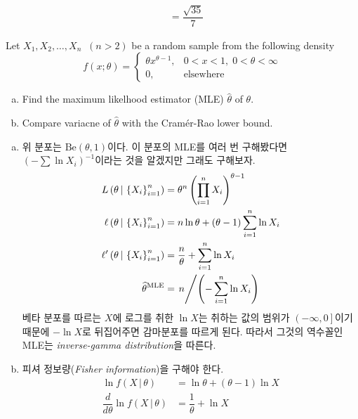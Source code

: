 \documentclass[answers]{exam}
\begin{document}
\begin{questions}
\begin{solution}
\begin{enumerate}[(a)]
\begin{align}
    			&= \dfrac{\sqrt{35}}{7}
    		\end{align}
    	\end{enumerate}
    \end{solution}
    \question
    Let $X_{1},X_{2},\ldots,X_{n}\;\;\left(n>2\right)$ be a random sample from the following density
    $$
      f\left(x;\theta\right)=\begin{cases}\theta x^{\theta-1}, & 0<x<1,\;0<\theta<\infty \\ 0, & \text{elsewhere}\end{cases}
    $$
    \begin{enumerate}[(a)]
      \item Find the maximum likelhood estimator (MLE) $\widehat{\theta}$ of $\theta$.
      \item Compare variacne of $\widehat{\theta}$ with the Cramér-Rao lower bound.
    \end{enumerate}
    \begin{solution}
    	\begin{enumerate}[(a)]
    		\item 위 분포는 $\mathrm{Be}\left(\theta,1\right)$이다. 이 분포의 MLE를 여러 번 구해봤다면 $\left(-\sum \ln X_{i}\right)^{-1}$이라는 것을 알겠지만 그래도 구해보자.
    		\begin{align}
    			L\left(\theta\,|\,\left\{X_{i}\right\}_{i=1}^{n}\right) &= \theta^{n}\left(\prod_{i=1}^{n}X_{i}\right)^{\theta-1}\\
    			\ell\left(\theta\,|\,\left\{X_{i}\right\}_{i=1}^{n}\right) &= n\ln \theta +\left(\theta-1\right)\sum_{i=1}^{n}\ln X_{i}\\
    			\ell'\left(\theta\,|\,\left\{X_{i}\right\}_{i=1}^{n}\right) &= \dfrac{n}{\theta}+\sum_{i=1}^{n}\ln X_{i}\\
    			\widehat{\theta}^{\text{MLE}} &= \left.n\middle/\left(-\sum_{i=1}^{n}\ln X_{i}\right)\right.
    		\end{align}
    		베타 분포를 따르는 $X$에 로그를 취한 $\ln X$는 취하는 값의 범위가 $\left(-\infty,0\right]$이기 때문에 $-\ln X$로 뒤집어주면 감마분포를 따르게 된다. 따라서 그것의 역수꼴인 MLE는 \emph{inverse-gamma distribution}을 따른다.
    		\item 피셔 정보량(\emph{Fisher information})을 구해야 한다.
    		\begin{align}
    			\ln f\left(X\,|\,\theta\right) &= \ln \theta +\left(\theta-1\right)\ln X\\
    			\dfrac{d}{d\theta}\ln f\left(X\,|\,\theta\right) &= \dfrac{1}{\theta}+\ln X\\

\end{align}
\end{enumerate}
\end{solution}
\end{questions}
\end{document}

